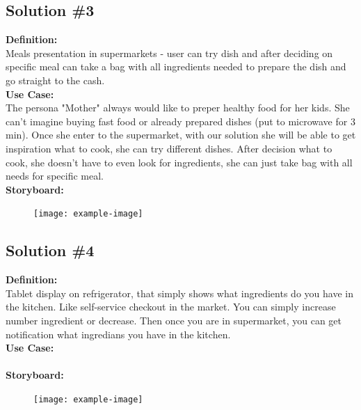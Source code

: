 \documentclass[a4paper,10pt,oneside]{scrreprt}
\begin{document}
		\clearpage

		\subsection{Solution \#3}

		\noindent \textbf{Definition:}\\
			Meals presentation in supermarkets - user can try dish and after deciding on specific meal can take a bag with all ingredients needed to prepare the dish and go straight to the cash.\\

			\noindent \textbf{Use Case:}\\
			The persona "Mother" always would like to preper healthy food for her kids. She can't imagine buying fast food or already prepared dishes (put to microwave for 3 min). Once she enter to the supermarket, with our solution she will be able to get inspiration what to cook, she can try different dishes. After decision what to cook, she doesn't have to even look for ingredients, she can just take bag with all needs for specific meal.\\

			\noindent \textbf{Storyboard:}\\

			\begin{figure}[H]
				\centering
				\texttt{[image: example-image]}
			\end{figure}

		\subsection{Solution \#4}

		\noindent \textbf{Definition:}\\
			Tablet display on refrigerator, that simply shows what ingredients do you have in the kitchen. Like self-service checkout
in the market. You can simply increase number ingredient or decrease. Then once you are in supermarket, you can get notification what ingredians you have in the kitchen.\\

			\noindent \textbf{Use Case:}\\
			\\

			\noindent \textbf{Storyboard:}\\

			\begin{figure}[H]
				\centering
				\texttt{[image: example-image]}
			\end{figure}
\end{document}

